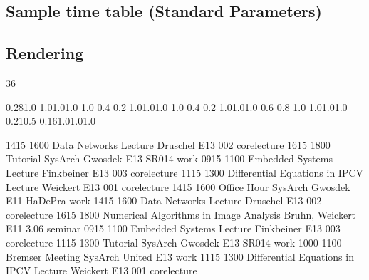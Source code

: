 \documentclass[a4paper,10pt]{article}
\begin{document}
\begin{appendix}
\begin{landscape}
\section{Sample time table (Standard Parameters)}
\subsection{Rendering}

\setslotsize{2.8cm}{0.26cm}
 {36}
\settextframe{0.8mm}

 {0.28}{1.0} {1.0}{1.0}{1.0}
    {1.0} {0.4} {0.2} {1.0}{1.0}{1.0}
 {1.0} {0.4} {0.2} {1.0}{1.0}{1.0}
   {0.6} {0.8} {1.0} {1.0}{1.0}{1.0}
       {0.21}{0.5} {0.16}{1.0}{1.0}{1.0}

\begin{timetable}
   {1415} {1600} {Data Networks Lecture}                  {Druschel}        {E1{\tiny 3} 002}     {corelecture}
   {1615} {1800} {Tutorial SysArch}                       {Gwosdek}         {E1{\tiny 3} SR014}   {work}
   {0915} {1100} {Embedded Systems Lecture}               {Finkbeiner}      {E1{\tiny 3} 003}     {corelecture}
   {1115} {1300} {Differential Equations in IPCV Lecture} {Weickert}        {E1{\tiny 3} 001}     {corelecture}
   {1415} {1600} {Office Hour SysArch}                    {Gwosdek}         {E1{\tiny 1} HaDePra} {work}
   {1415} {1600} {Data Networks Lecture}                  {Druschel}        {E1{\tiny 3} 002}     {corelecture}
   {1615} {1800} {Numerical Algorithms in Image Analysis} {Bruhn, Weickert} {E1{\tiny 1} 3.06}    {seminar}
   {0915} {1100} {Embedded Systems Lecture}               {Finkbeiner}      {E1{\tiny 3} 003}     {corelecture}
   {1115} {1300} {Tutorial SysArch}                       {Gwosdek}         {E1{\tiny 3} SR014}   {work}
   {1000} {1100} {Bremser Meeting}                        {SysArch United}  {E1{\tiny 3}}         {work}
   {1115} {1300} {Differential Equations in IPCV Lecture} {Weickert}        {E1{\tiny 3} 001}     {corelecture}
\end{timetable}
\end{landscape}


\end{appendix}
\end{document}
